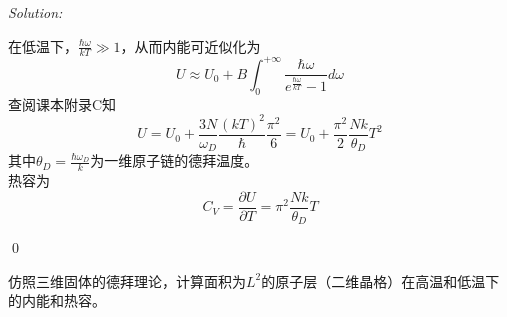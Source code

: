 \documentclass[12pt,a4paper]{article}
\newenvironment{problem}[2][Problem]{\begin{trivlist}
\item[\hskip \labelsep {\bfseries #1}\hskip \labelsep {\bfseries #2.}]}{\end{trivlist}}
\newenvironment{sol}
    {\emph{Solution:}
    }
    {
    \qed
    }
\begin{document}
\begin{sol}
在低温下，$\frac{\hbar\omega}{kT}\gg1$，从而内能可近似化为
\begin{equation}
U\approx U_0+B\int_0^{+\infty}\frac{\hbar\omega}{e^{\frac{\hbar\omega}{kT}}-1}d\omega
\end{equation}
查阅课本附录C知
\begin{equation}
U=U_0+\frac{3N}{\omega_D}\frac{(kT)^2}{\hbar}\frac{\pi^2}{6}=U_0+\frac{\pi^2}{2}\frac{Nk}{\theta_D}T^2
\end{equation}
其中$\theta_D=\frac{\hbar\omega_D}{k}$为一维原子链的德拜温度。\\
热容为
\begin{equation}
C_V=\frac{\partial U}{\partial T}=\pi^2\frac{Nk}{\theta_D}T
\end{equation}
\end{sol}

\begin{problem}{9.10}
仿照三维固体的德拜理论，计算面积为$L^2$的原子层（二维晶格）在高温和低温下的内能和热容。
\end{problem}
\end{document}
